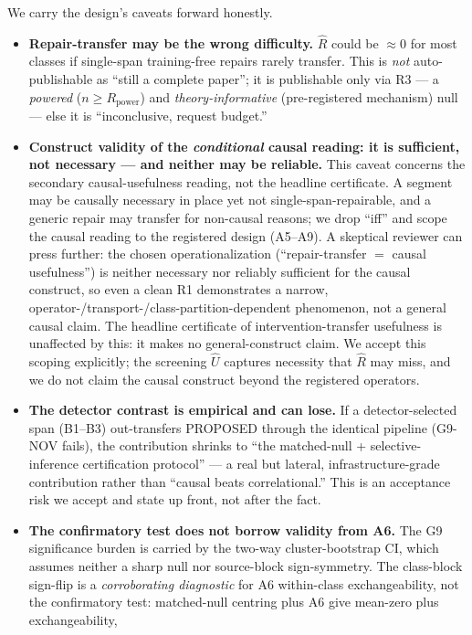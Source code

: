 \documentclass[11pt]{article}
\theoremstyle{plain}
\theoremstyle{definition}
\newcommand{\Uhat}{\widehat{U}}
\newcommand{\Rhat}{\widehat{R}}
\begin{document}
We carry the design's caveats forward honestly.
\begin{itemize}[leftmargin=1.4em,itemsep=2pt]
  \item \textbf{Repair-transfer may be the wrong difficulty.} $\Rhat$ could be
  $\approx0$ for most classes if single-span training-free repairs rarely transfer.
  This is \emph{not} auto-publishable as ``still a complete paper''; it is
  publishable only via R3 --- a \emph{powered} ($n\ge R_{\mathrm{power}}$) and
  \emph{theory-informative} (pre-registered mechanism) null --- else it is
  ``inconclusive, request budget.''
  \item \textbf{Construct validity of the \emph{conditional} causal reading: it is
  sufficient, not necessary --- and neither may be reliable.} This caveat concerns the
  secondary causal-usefulness reading, not the headline certificate. A segment may be
  causally necessary in place yet not single-span-repairable, and a generic repair may
  transfer for non-causal reasons; we drop ``iff'' and scope the causal reading to the
  registered design (A5--A9). A skeptical reviewer can press further: the chosen
  operationalization (``repair-transfer $=$ causal usefulness'') is neither necessary
  nor reliably sufficient for the causal construct, so even a clean R1 demonstrates a
  narrow, operator-/transport-/class-partition-dependent phenomenon, not a general
  causal claim. The headline certificate of intervention-transfer usefulness is
  unaffected by this: it makes no general-construct claim. We accept this scoping
  explicitly; the screening $\Uhat$ captures necessity that $\Rhat$ may miss, and we do
  not claim the causal construct beyond the registered operators.
  \item \textbf{The detector contrast is empirical and can lose.} If a
  detector-selected span (B1--B3) out-transfers PROPOSED through the identical
  pipeline (G9-NOV fails), the contribution shrinks to ``the matched-null +
  selective-inference certification protocol'' --- a real but lateral,
  infrastructure-grade contribution rather than ``causal beats correlational.'' This is
  an acceptance risk we accept and state up front, not after the fact.
  \item \textbf{The confirmatory test does not borrow validity from A6.} The G9
  significance burden is carried by the two-way cluster-bootstrap CI, which assumes
  neither a sharp null nor source-block sign-symmetry. The class-block sign-flip is a
  \emph{corroborating diagnostic} for A6 within-class exchangeability, not the
  confirmatory test: matched-null centring plus A6 give mean-zero plus exchangeability,

\end{itemize}
\end{document}
